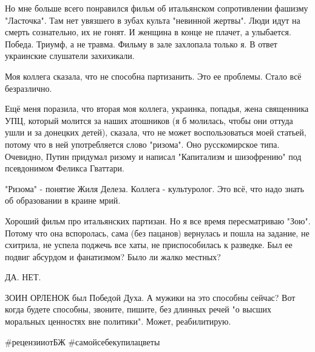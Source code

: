 Но мне больше всего понравился фильм об итальянском сопротивлении фашизму
"Ласточка". Там нет увязшего в зубах культа "невинной жертвы". Люди идут на
смерть сознательно, их не гонят. И женщина в конце не плачет, а улыбается.
Победа. Триумф, а не травма. Фильму в зале захлопала только я. В ответ
украинские слушатели захихикали.

Моя коллега сказала, что не способна партизанить. Это ее проблемы. Стало всё
безразлично.

Ещё меня поразила, что вторая моя коллега, украинка, попадья, жена священника
УПЦ, который молится за наших атошников (я б молилась, чтобы они оттуда ушли и
за донецких детей), сказала, что не может воспользоваться моей статьей, потому
что в ней употребляется слово "ризома". Оно русскомирское типа. Очевидно, Путин
придумал ризому и написал "Капитализм и шизофрению" под псевдонимом Феликса
Гваттари.

"Ризома" - понятие Жиля Делеза. Коллега - культуролог. Это всё, что надо знать
об образовании в краине мрий.

Хороший фильм про итальянских партизан. Но я все время пересматриваю "Зою".
Потому что она вспоролась, сама (без пацанов) вернулась и пошла на задание, не
схитрила, не успела поджечь все хаты, не приспособилась к разведке. Был ее
подвиг абсурдом и фанатизмом? Было ли жалко местных?

ДА. НЕТ.

ЗОИН ОРЛЕНОК был Победой Духа. А мужики на это способны сейчас? Вот когда
будете способны, звоните, пишите, без длинных речей "о высших моральных
ценностях вне политики". Может, реабилитирую.

\#рецензииотБЖ
\#самойсебекупилацветы
